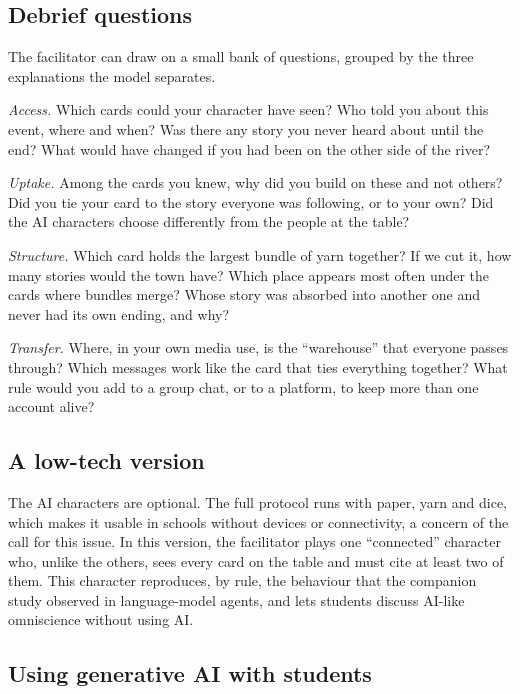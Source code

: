 \documentclass[12pt]{article}
\begin{document}
\subsection{Debrief questions}

The facilitator can draw on a small bank of questions, grouped by the three
explanations the model separates.

\emph{Access.} Which cards could your character have seen? Who told you
about this event, where and when? Was there any story you never heard about
until the end? What would have changed if you had been on the other side of
the river?

\emph{Uptake.} Among the cards you knew, why did you build on these and not
others? Did you tie your card to the story everyone was following, or to your
own? Did the AI characters choose differently from the people at the table?

\emph{Structure.} Which card holds the largest bundle of yarn together? If
we cut it, how many stories would the town have? Which place appears most
often under the cards where bundles merge? Whose story was absorbed into
another one and never had its own ending, and why?

\emph{Transfer.} Where, in your own media use, is the \enquote{warehouse}
that everyone passes through? Which messages work like the card that ties
everything together? What rule would you add to a group chat, or to a
platform, to keep more than one account alive?

\subsection{A low-tech version}

The AI characters are optional. The full protocol runs with paper, yarn and
dice, which makes it usable in schools without devices or connectivity, a
concern of the call for this issue. In this version, the facilitator plays
one \enquote{connected} character who, unlike the others, sees every card on
the table and must cite at least two of them. This character reproduces, by
rule, the behaviour that the companion study observed in language-model
agents, and lets students discuss AI-like omniscience without using AI.

\subsection{Using generative AI with students}
\end{document}
